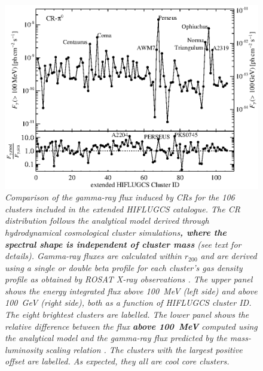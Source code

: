\documentclass[10pt,aps,pra,reprint,amsmath,amsfonts,amssymb,showpacs,nofootinbib,floatfix]{revtex4-1}
\def\del#1{{}}
\def\C#1{{\bf #1}}
\newcommand{\rmn}{\mathrm}
\newcommand{\msun}{M_\odot}
\newcommand{\rvir}{r_{200}}
\newcommand{\mvir}{M_{200}}
\begin{document}
\begin{figure}%
\begin{minipage}{2.0\columnwidth}
 \includegraphics[width=0.99\columnwidth]{figures/Flux.comp.CR.eps}
 \caption{\it Comparison of the gamma-ray flux induced by CRs for the
   106 clusters included in the extended HIFLUGCS catalogue. The CR
   distribution follows the analytical model derived through
   hydrodynamical cosmological cluster simulations\C{, where the
     spectral shape is independent of cluster mass} \protect
   \cite{2010MNRAS.409..449P} (see text for details). Gamma-ray fluxes
   are calculated within $\rvir$ and are derived using a single or
   double beta profile for each cluster's gas density profile as
   obtained by ROSAT X-ray observations
   \cite{2007A&A...466..805C}. The upper panel shows the energy
   integrated flux above 100~MeV (left side) and above 100~GeV (right
   side), both as a function of HIFLUGCS cluster ID. The eight
   brightest clusters are labelled. The lower panel shows the relative
   difference between the flux \C{above 100~MeV} computed using the
   analytical model and the gamma-ray flux predicted by the
   mass-luminosity scaling relation
   \cite{2010MNRAS.409..449P}. \del{For this figure we have used that
     $F_\gamma(100\,\rmn{GeV})\propto F_\gamma(100\,\rmn{MeV})\propto
     M^{1.46}$, which introduce an error of 50\% in the mass range
     $5\times10^{13}\msun<\mvir<10^{15}\msun$.} The clusters with the
   largest positive offset are labelled. As expected, they all are
   cool core clusters.}
 \label{fig19}
\end{minipage}
\end{figure}
\end{document}
